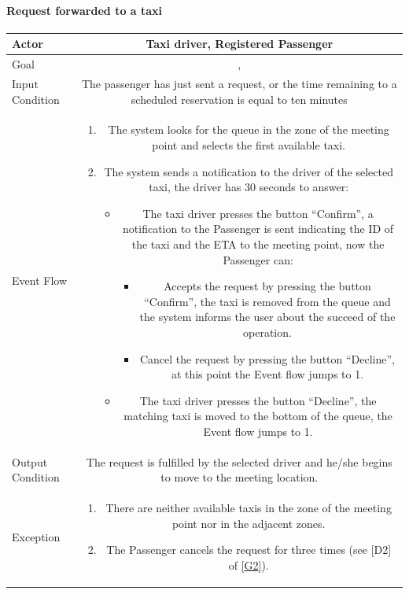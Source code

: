 \documentclass[a4paper,12pt,dvipsnames]{article}%
\newcommand{\usecasetable}[6]{
\begin{center}
\def\arraystretch{1.5}
\begin{tabularx}{\textwidth}{|s|C|}
\hline
Actor & #1\\
\hline
Goal & #2\\
\hline
Input Condition & #3 \\
\hline
Event Flow & #4\\
\hline
Output Condition & #5\\
\hline
Exception & #6\\
\hline
\end{tabularx}
\end{center}
}
\begin{document}
\paragraph{Request forwarded to a taxi}
\usecasetable{Taxi driver, Registered Passenger}{, \nameref{goal3}}{The passenger has just sent a request, or the time remaining to a scheduled reservation is equal to ten minutes}
{
\begin{minipage}[b]{11cm}
\begin{enumerate}
\item The system looks for the queue in the zone of the meeting point and selects the first available taxi. 
\item The system sends a notification to the driver of the selected taxi, the driver has 30 seconds to answer:
\begin{itemize}
\item The taxi driver presses the button ``Confirm'', a notification to the Passenger is sent indicating the ID of the taxi and the ETA to the meeting point, now the Passenger can:
\begin{itemize}
\item Accepts the request by pressing the button ``Confirm'', the taxi is removed from the queue and the system informs the user about the succeed of the operation.
\item Cancel the request by pressing the button ``Decline'', at this point the Event flow jumps to 1.\end{itemize}
\item The taxi driver presses the button ``Decline'', the matching taxi is moved to the bottom of the queue, the Event flow jumps to 1.
\end{itemize}
\end{enumerate}
\end{minipage}
}
{The request is fulfilled by the selected driver and he/she begins to move to the meeting location.}
{
\begin{minipage}[b]{11cm}
\begin{enumerate}
\item There are neither available taxis in the zone of the meeting point nor in the adjacent zones.
\item The Passenger cancels the request for three times (see [D2] of \hyperref[goal2]{{[}G2{]}}).
\end{enumerate}
\end{minipage}
}
\end{document}
